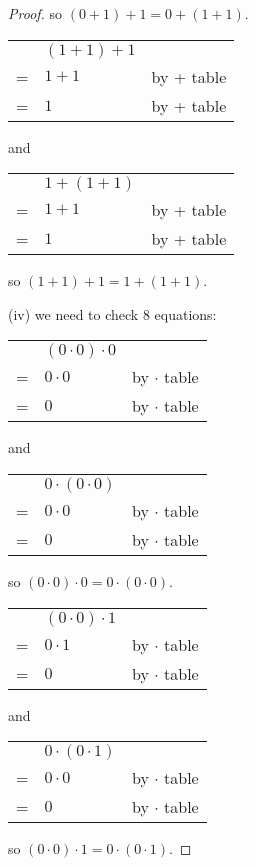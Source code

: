 \documentclass[14pt]{extarticle}
\newcommand{\cy}{\color{cyan}}
\begin{document}
\begin{proof}
  so \((0 + 1) + 1 = 0 + (1 + 1)\).

  \begin{tabular}{cll}
      & \((1 + 1) + 1\) &                  \\
    = & \(1 + 1\)       & {\cy by + table} \\
    = & \(1\)           & {\cy by + table}
  \end{tabular}
  and
  \begin{tabular}{cll}
      & \(1 + (1 + 1)\) &                  \\
    = & \(1 + 1\)       & {\cy by + table} \\
    = & \(1\)           & {\cy by + table}
  \end{tabular}

  so \((1 + 1) + 1 = 1 + (1 + 1)\).

  (iv) we need to check 8 equations:

  \begin{tabular}{cll}
      & \((0 \cdot 0) \cdot 0\) &                        \\
    = & \(0 \cdot 0\)           & {\cy by $\cdot$ table} \\
    = & \(0\)                   & {\cy by $\cdot$ table}
  \end{tabular}
  and
  \begin{tabular}{cll}
      & \(0 \cdot (0 \cdot 0)\) &                        \\
    = & \(0 \cdot 0\)           & {\cy by $\cdot$ table} \\
    = & \(0\)                   & {\cy by $\cdot$ table}
  \end{tabular}
  so \((0 \cdot 0) \cdot 0 = 0 \cdot (0 \cdot 0)\).

  \begin{tabular}{cll}
      & \((0 \cdot 0) \cdot 1\) &                        \\
    = & \(0 \cdot 1\)           & {\cy by $\cdot$ table} \\
    = & \(0\)                   & {\cy by $\cdot$ table}
  \end{tabular}
  and
  \begin{tabular}{cll}
      & \(0 \cdot (0 \cdot 1)\) &                        \\
    = & \(0 \cdot 0\)           & {\cy by $\cdot$ table} \\
    = & \(0\)                   & {\cy by $\cdot$ table}
  \end{tabular}
  so \((0 \cdot 0) \cdot 1 = 0 \cdot (0 \cdot 1)\).


\end{proof}
\end{document}
